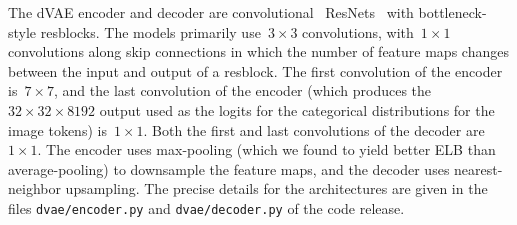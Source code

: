 \documentclass{article}
\begin{document}
The dVAE encoder and decoder are convolutional~\cite{lecun1998gradient} ResNets~\cite{he2016identity} with bottleneck-style resblocks. The models primarily use~$3 \times 3$ convolutions, with~$1 \times 1$ convolutions along skip connections in which the number of feature maps changes between the input and output of a resblock. The first convolution of the encoder is~$7 \times 7$, and the last convolution of the encoder (which produces the~$32 \times 32 \times 8192$ output used as the logits for the categorical distributions for the image tokens) is~$1 \times 1$. Both the first and last convolutions of the decoder are~$1 \times 1$. The encoder uses max-pooling (which we found to yield better ELB than average-pooling) to downsample the feature maps, and the decoder uses nearest-neighbor upsampling. The precise details for the architectures are given in the files \texttt{dvae/encoder.py} and \texttt{dvae/decoder.py} of the code release.
\end{document}
